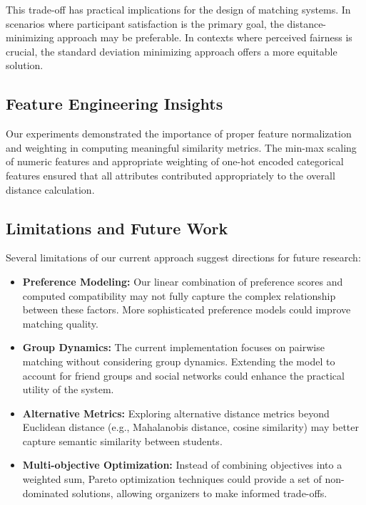 \documentclass[10pt,journal,compsoc]{IEEEtran}
\begin{document}
This trade-off has practical implications for the design of matching systems. In scenarios where participant satisfaction is the primary goal, the distance-minimizing approach may be preferable. In contexts where perceived fairness is crucial, the standard deviation minimizing approach offers a more equitable solution.

\subsection{Feature Engineering Insights}
Our experiments demonstrated the importance of proper feature normalization and weighting in computing meaningful similarity metrics. The min-max scaling of numeric features and appropriate weighting of one-hot encoded categorical features ensured that all attributes contributed appropriately to the overall distance calculation.

\subsection{Limitations and Future Work}
Several limitations of our current approach suggest directions for future research:

\begin{itemize}
\item \textbf{Preference Modeling:} Our linear combination of preference scores and computed compatibility may not fully capture the complex relationship between these factors. More sophisticated preference models could improve matching quality.

\item \textbf{Group Dynamics:} The current implementation focuses on pairwise matching without considering group dynamics. Extending the model to account for friend groups and social networks could enhance the practical utility of the system.

\item \textbf{Alternative Metrics:} Exploring alternative distance metrics beyond Euclidean distance (e.g., Mahalanobis distance, cosine similarity) may better capture semantic similarity between students.

\item \textbf{Multi-objective Optimization:} Instead of combining objectives into a weighted sum, Pareto optimization techniques could provide a set of non-dominated solutions, allowing organizers to make informed trade-offs.
\end{itemize}
\end{document}
